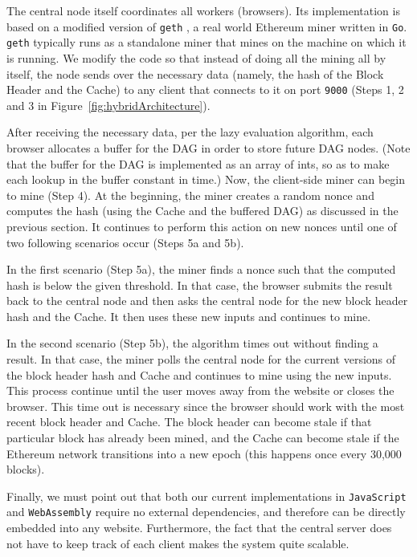 \documentclass[runningheads]{llncs}
\begin{document}
The central node itself coordinates all workers (browsers). Its implementation is based on a modified version of \verb|geth| \cite{geth}, a real world Ethereum miner written in \verb|Go|. \verb|geth| typically runs as a standalone miner that mines on the machine on which it is running. We modify the code so that instead of doing all the mining all by itself, the node sends over the necessary data (namely, the hash of the Block Header and the Cache) to any client that connects to it on port \verb|9000| (Steps 1, 2 and 3 in Figure~\ref{fig:hybridArchitecture}). 

After receiving the necessary data, per the lazy evaluation algorithm, each browser allocates a buffer for the DAG in order to store future DAG nodes. (Note that the buffer for the DAG is implemented as an array of ints, so as to make each lookup in the buffer constant in time.) Now, the client-side miner can begin to mine (Step 4). 
At the beginning, the miner creates a random nonce and computes the hash (using the Cache and the buffered DAG) as discussed in the previous section. It continues to perform this action on new nonces until one of two following scenarios occur (Steps 5a and 5b). 

In the first scenario (Step 5a), the miner finds a nonce such that the computed hash is below the given threshold. In that case, the browser submits the result back to the central node and then asks the central node for the new block header hash and the Cache. It then uses these new inputs and continues to mine.

In the second scenario (Step 5b), the algorithm times out without finding a result. In that case, the miner polls the central node for the current versions of the block header hash and Cache and continues to mine using the new inputs. This process continue until the user moves away from the website or closes the browser. 
This time out is necessary since the browser should work with the most recent block header and Cache. The block header can become stale if that particular block has already been mined, and the Cache can become stale if the Ethereum network transitions into a new epoch (this happens once every 30,000 blocks). 

Finally, we must point out that both our current implementations in \verb|JavaScript| and \verb|WebAssembly| require no external dependencies, and therefore can be directly embedded into any website. Furthermore, the fact that the central server does not have to keep track of each client makes the system quite scalable. 
\end{document}
